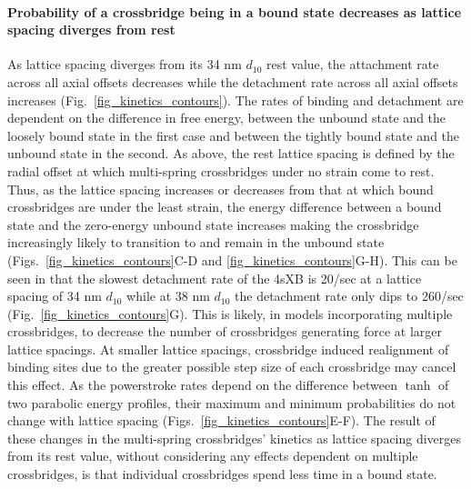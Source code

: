 \documentclass[]{article}
\begin{document}
\paragraph{Probability of a crossbridge being in a bound state decreases as lattice spacing diverges from rest} %
As lattice spacing diverges from its 34 nm $d_{10}$ rest value, the attachment rate across all axial offsets decreases while the detachment rate across all axial offsets increases (Fig.~\ref{fig_kinetics_contours}). 
The rates of binding and detachment are dependent on the difference in free energy, between the unbound state and the loosely bound state in the first case and between the tightly bound state and the unbound state in the second.
As above, the rest lattice spacing is defined by the radial offset at which multi-spring crossbridges under no strain come to rest.
Thus, as the lattice spacing increases or decreases from that at which bound crossbridges are under the least strain, the energy difference between a bound state and the zero-energy unbound state increases making the crossbridge increasingly likely to transition to and remain in the unbound state (Figs.~\ref{fig_kinetics_contours}C-D and  \ref{fig_kinetics_contours}G-H). 
This can be seen in that the slowest detachment rate of the 4sXB is 20/sec at a lattice spacing of 34 nm $d_{10}$ while at 38 nm $d_{10}$ the detachment rate only dips to 260/sec (Fig.~\ref{fig_kinetics_contours}G).
This is likely, in models incorporating multiple crossbridges, to decrease the number of crossbridges generating force at larger lattice spacings. 
At smaller lattice spacings, crossbridge induced realignment of binding sites due to the greater possible step size of each crossbridge may cancel this effect.
As the powerstroke rates depend on the difference between $\tanh$ of two parabolic energy profiles, their maximum and minimum probabilities do not change with lattice spacing (Figs.~\ref{fig_kinetics_contours}E-F). 
The result of these changes in the multi-spring crossbridges' kinetics as lattice spacing diverges from its rest value, without considering any effects dependent on multiple crossbridges, is that individual crossbridges spend less time in a bound state. 
\end{document}
